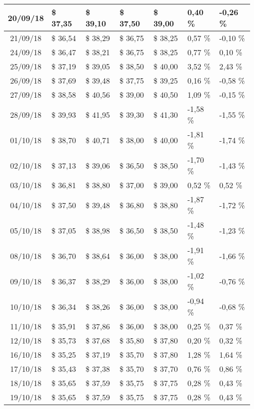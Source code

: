 \begin{center}
\begin{longtable}{|c|p{1.5cm}|p{1.5cm}|p{1.5cm}|p{1.5cm}|p{1.5cm}|p{1.5cm}|}
20/09/18 & \$ 37,35 & \$ 39,10 & \$ 37,50 & \$ 39,00 & 0,40 \% & -0,26 \% \\ \hline
21/09/18 & \$ 36,54 & \$ 38,29 & \$ 36,75 & \$ 38,25 & 0,57 \% & -0,10 \% \\ \hline
24/09/18 & \$ 36,47 & \$ 38,21 & \$ 36,75 & \$ 38,25 & 0,77 \% & 0,10 \% \\ \hline
25/09/18 & \$ 37,19 & \$ 39,05 & \$ 38,50 & \$ 40,00 & 3,52 \% & 2,43 \% \\ \hline
26/09/18 & \$ 37,69 & \$ 39,48 & \$ 37,75 & \$ 39,25 & 0,16 \% & -0,58 \% \\ \hline
27/09/18 & \$ 38,58 & \$ 40,56 & \$ 39,00 & \$ 40,50 & 1,09 \% & -0,15 \% \\ \hline
28/09/18 & \$ 39,93 & \$ 41,95 & \$ 39,30 & \$ 41,30 & -1,58 \% & -1,55 \% \\ \hline
01/10/18 & \$ 38,70 & \$ 40,71 & \$ 38,00 & \$ 40,00 & -1,81 \% & -1,74 \% \\ \hline
02/10/18 & \$ 37,13 & \$ 39,06 & \$ 36,50 & \$ 38,50 & -1,70 \% & -1,43 \% \\ \hline
03/10/18 & \$ 36,81 & \$ 38,80 & \$ 37,00 & \$ 39,00 & 0,52 \% & 0,52 \% \\ \hline
04/10/18 & \$ 37,50 & \$ 39,48 & \$ 36,80 & \$ 38,80 & -1,87 \% & -1,72 \% \\ \hline
05/10/18 & \$ 37,05 & \$ 38,98 & \$ 36,50 & \$ 38,50 & -1,48 \% & -1,23 \% \\ \hline
08/10/18 & \$ 36,70 & \$ 38,64 & \$ 36,00 & \$ 38,00 & -1,91 \% & -1,66 \% \\ \hline
09/10/18 & \$ 36,37 & \$ 38,29 & \$ 36,00 & \$ 38,00 & -1,02 \% & -0,76 \% \\ \hline
10/10/18 & \$ 36,34 & \$ 38,26 & \$ 36,00 & \$ 38,00 & -0,94 \% & -0,68 \% \\ \hline
11/10/18 & \$ 35,91 & \$ 37,86 & \$ 36,00 & \$ 38,00 & 0,25 \% & 0,37 \% \\ \hline
12/10/18 & \$ 35,73 & \$ 37,68 & \$ 35,80 & \$ 37,80 & 0,20 \% & 0,32 \% \\ \hline
16/10/18 & \$ 35,25 & \$ 37,19 & \$ 35,70 & \$ 37,80 & 1,28 \% & 1,64 \% \\ \hline
17/10/18 & \$ 35,43 & \$ 37,38 & \$ 35,70 & \$ 37,70 & 0,76 \% & 0,86 \% \\ \hline
18/10/18 & \$ 35,65 & \$ 37,59 & \$ 35,75 & \$ 37,75 & 0,28 \% & 0,43 \% \\ \hline
19/10/18 & \$ 35,65 & \$ 37,59 & \$ 35,75 & \$ 37,75 & 0,28 \% & 0,43 \% \\ \hline

\end{longtable}
\end{center}
